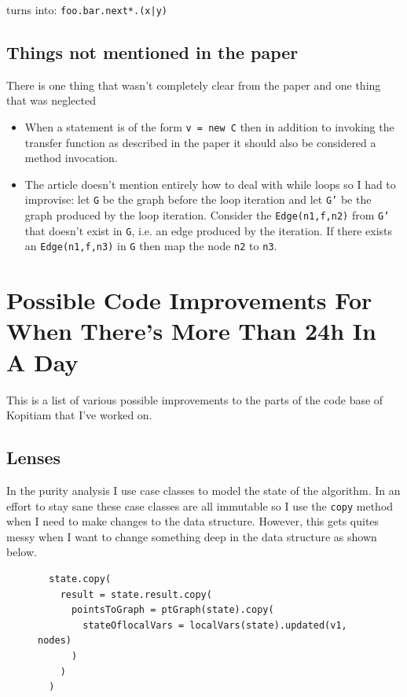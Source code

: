 \documentclass[11pt]{exam}
\begin{document}
turns into: \texttt{foo.bar.next*.(x|y)}

\subsection{Things not mentioned in the paper}

There is one thing that wasn't completely clear from the paper and one
thing that was neglected

\begin{itemize}
  \item When a statement is of the form \texttt{v = new C} then in 
        addition to invoking the transfer function as described in 
        the paper it should also be considered a method invocation.
  \item The article doesn't mention entirely how to deal with while loops 
        so I had to improvise: let \texttt{G} be the graph before the loop 
        iteration and let \texttt{G'} be the graph produced by the loop 
        iteration. Consider the \texttt{Edge(n1,f,n2)} from \texttt{G'} 
        that doesn't exist in \texttt{G}, i.e. an edge produced by the 
        iteration. If there exists an \texttt{Edge(n1,f,n3)} in \texttt{G} 
        then map the node \texttt{n2} to \texttt{n3}.
\end{itemize}

\newpage

\section{Possible Code Improvements For When There's More Than 24h In A Day}

This is a list of various possible improvements to the parts of the
code base of Kopitiam that I've worked on.

\subsection{Lenses}

In the purity analysis I use case classes to model the state of the
algorithm. In an effort to stay sane these case classes are all
immutable so I use the \texttt{copy} method when I need to make
changes to the data structure. However, this gets quites messy when I
want to change something deep in the data structure as shown below.

\begin{figure}[h!]
  \begin{lstlisting}
  state.copy(
    result = state.result.copy(
      pointsToGraph = ptGraph(state).copy(
        stateOflocalVars = localVars(state).updated(v1, nodes)
      )
    )
  )
  \end{lstlisting}
\end{figure}
\end{document}
